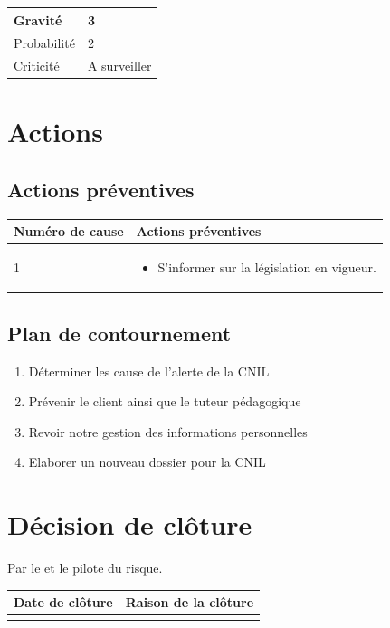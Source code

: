 \begin{table}[h]
\centering
	\begin{tabularx}{12.8cm}{|>{}X|X|}
	\hline
	Gravité & 3\\
	\hline
	Probabilité & 2\\
	\hline
	Criticité & A surveiller\\
	\hline
	\end{tabularx}
\end{table}
\newpage

\section*{Actions}
\subsection*{Actions préventives}

\centering
	\begin{longtable}{|p{7cm}|p{7cm}|}
	\hline
	Numéro de cause & Actions préventives \\
	\hline
	 1 & \begin{itemize}
	 	\item S'informer sur la législation en vigueur.
	 \end{itemize} \\
	\hline

	\end{longtable}

\flushleft
\subsection*{Plan de contournement}

\begin{enumerate}
	\item Déterminer les cause de l'alerte de la CNIL
	\item Prévenir le client ainsi que le tuteur pédagogique
	\item Revoir notre gestion des informations personnelles
	\item Elaborer un nouveau dossier pour la CNIL
\end{enumerate}

\section*{Décision de clôture}
Par le \CP{} et le pilote du risque.
\begin{table}[H]
\centering
	\begin{tabularx}{12.8cm}{|X|X|}
	\hline
	Date de clôture & Raison de la clôture \\
	\hline
	  & \\
	\hline
	\end{tabularx}
\end{table}


